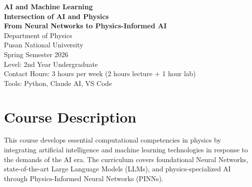 \documentclass[11pt,a4paper]{article}
\begin{document}
\begin{center}
    {\Huge\bfseries\color{titleblue} AI and Machine Learning}\\[0.2cm]
    {\Huge\bfseries\color{titleblue} Intersection of AI and Physics}\\[0.5cm]
    {\Large\textbf{From Neural Networks to Physics-Informed AI}}\\[1cm]
    
    {\large Department of Physics}\\
    {\large Pusan National University}\\[0.5cm]
    {\large Spring Semester 2026}\\[0.3cm]
    {\large Level: 2nd Year Undergraduate}\\[0.3cm]
    {\large Contact Hours: 3 hours per week (2 hours lecture + 1 hour lab)}\\[0.3cm]
    {\large Tools: Python, Claude AI, VS Code}\\[1cm]
\end{center}

\noindent{}

\vspace{0.5cm}

\section{Course Description}

This course develops essential computational competencies in physics by integrating artificial intelligence and machine learning technologies in response to the demands of the AI era. The curriculum covers foundational Neural Networks, state-of-the-art Large Language Models (LLMs), and physics-specialized AI through Physics-Informed Neural Networks (PINNs).
\end{document}

